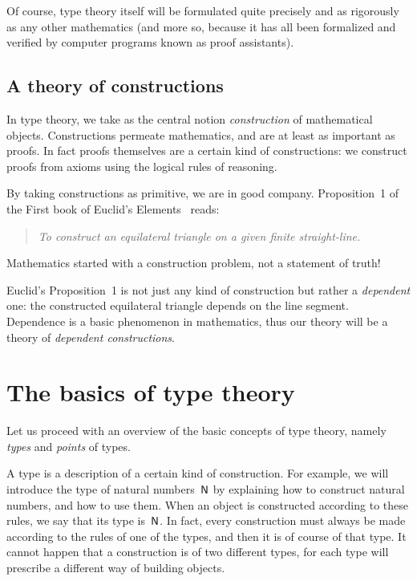 \documentclass{amsart}
\begin{document}
Of course, type theory itself will be formulated quite precisely and as
rigorously as any other mathematics (and more so, because it has all been
formalized and verified by computer programs known as proof assistants).


\subsection{A theory of constructions}

In type theory, we take as the central notion \emph{construction} of
mathematical objects. Constructions permeate mathematics, and are at least as
important as proofs. In fact proofs themselves are a certain kind of
constructions: we construct proofs from axioms using the logical rules of
reasoning.

By taking constructions as primitive, we are in good company. Proposition~1 of
the First book of Euclid's Elements~\cite{fitzpatrick09:_euclid_elemen} reads:
%
\begin{quote}
  \textit{To construct an equilateral triangle on a given finite straight-line.}
\end{quote}
%
Mathematics started with a construction problem, not a statement of truth!

Euclid's Proposition~1 is not just any kind of construction but rather a
\emph{dependent} one: the constructed equilateral triangle depends on the line
segment. Dependence is a basic phenomenon in mathematics, thus our theory will
be a theory of \emph{dependent constructions}.

\section{The basics of type theory}

Let us proceed with an overview of the basic concepts of type theory, namely
\emph{types} and \emph{points} of types.

A type is a description of a certain kind of construction. For example, we
will introduce the type of natural numbers~$\mathsf{N}$ by explaining how to
construct natural numbers, and how to use them. When an object is constructed
according to these rules, we say that its type is~$\mathsf{N}$. In fact, every
construction must always be made according to the rules of one of the types, and
then it is of course of that type. It cannot happen that a construction is of
two different types, for each type will prescribe a different way of building
objects.
\end{document}
